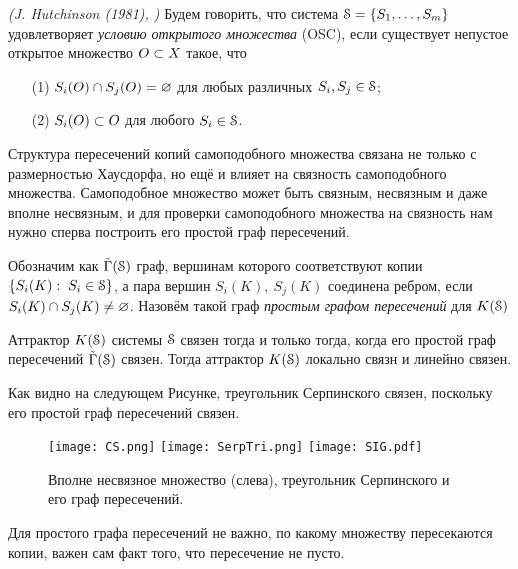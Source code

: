 \begin{definition}{\em (J. Hutchinson (1981), \cite{Hut1981})}\label{dfn:osc}
Будем говорить, что система ${\EuScript S}=\{S_1,\ldots,S_m\}$ удовлетворяет {\em условию открытого множества} (OSC), если существует непустое открытое множество $O \subset X$ такое, что
\begin{enumerate}[nolistsep]
\item[(1)] $S_i(O)\cap S_j(O)=\varnothing$ для любых различных $S_i,S_j\in{\EuScript S}$;
\item[(2)] $S_i(O)\subset O$ для любого $S_i\in{\EuScript S}$.
\end{enumerate}
\end{definition}

Структура пересечений копий самоподобного множества связана не только с размерностью Хаусдорфа, но ещё и влияет на связность самоподобного множества.
Самоподобное множество может быть связным, несвязным и даже вполне несвязным, и для проверки самоподобного множества на связность нам нужно сперва построить его простой граф пересечений. 

\begin{definition}
Обозначим как $\tilde{\Gamma}({\EuScript S})$ граф, вершинам которого соответствуют копии $\{S_i(K):\; S_i\in {\EuScript S}\}$, а пара вершин $S_i(K),\ S_j(K)$ соединена ребром, если $S_i(K)\cap S_j(K)\neq\varnothing$.
Назовём такой граф {\em простым графом пересечений} для $K({\EuScript S})$ 
\end{definition}

\begin{theorem}
Аттрактор $K({\EuScript S})$ системы ${\EuScript S}$ связен тогда и только тогда, когда его простой граф пересечений $\tilde{\Gamma}({\EuScript S})$ связен.
Тогда аттрактор $K({\EuScript S})$ локально связн и линейно связен.
\end{theorem}

Как видно на следующем Рисунке, треугольник Серпинского связен, поскольку его простой граф пересечений связен.

\begin{figure}[H]
\texttt{[image: CS.png]}
\hfill
\texttt{[image: SerpTri.png]}
\hfill
\texttt{[image: SIG.pdf]}
\caption{Вполне несвязное множество (слева), треугольник Серпинского и его граф пересечений.}
\end{figure}

Для простого графа пересечений не важно, по какому множеству пересекаются копии, важен сам факт того, что пересечение не пусто.



